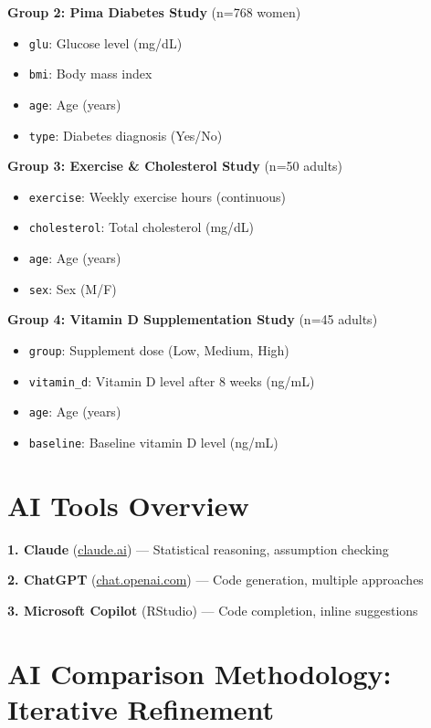 \documentclass[9pt]{article}
\begin{document}
\textbf{Group 2: Pima Diabetes Study} (n=768 women)
\begin{itemize}
\item \texttt{glu}: Glucose level (mg/dL)
\item \texttt{bmi}: Body mass index
\item \texttt{age}: Age (years)
\item \texttt{type}: Diabetes diagnosis (Yes/No)
\end{itemize}

\textbf{Group 3: Exercise \& Cholesterol Study} (n=50 adults)
\begin{itemize}
\item \texttt{exercise}: Weekly exercise hours (continuous)
\item \texttt{cholesterol}: Total cholesterol (mg/dL)
\item \texttt{age}: Age (years)
\item \texttt{sex}: Sex (M/F)
\end{itemize}

\textbf{Group 4: Vitamin D Supplementation Study} (n=45 adults)
\begin{itemize}
\item \texttt{group}: Supplement dose (Low, Medium, High)
\item \texttt{vitamin\_d}: Vitamin D level after 8 weeks (ng/mL)
\item \texttt{age}: Age (years)
\item \texttt{baseline}: Baseline vitamin D level (ng/mL)
\end{itemize}

\vspace{2pt}

\section*{AI Tools Overview}

\textbf{1. Claude} (\url{claude.ai}) — Statistical reasoning, assumption checking

\textbf{2. ChatGPT} (\url{chat.openai.com}) — Code generation, multiple approaches

\textbf{3. Microsoft Copilot} (RStudio) — Code completion, inline suggestions

\vspace{2pt}

\section*{AI Comparison Methodology: Iterative Refinement}
\end{document}
